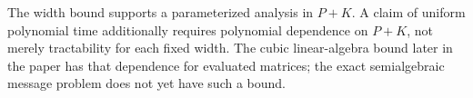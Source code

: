 \begin{remark}
The width bound supports a parameterized analysis in \(P+K\).  A claim of
uniform polynomial time additionally requires polynomial dependence on
\(P+K\), not merely tractability for each fixed width.  The cubic linear-algebra
bound later in the paper has that dependence for evaluated matrices; the exact
semialgebraic message problem does not yet have such a bound.
\end{remark}
